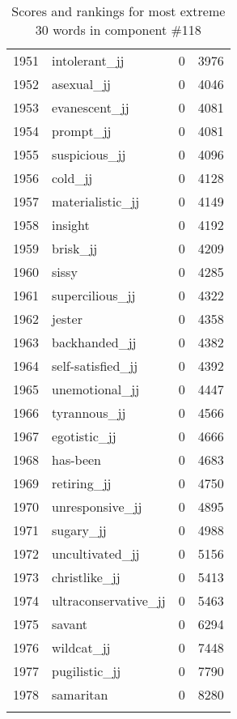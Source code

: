 \begin{longtable}[!htbp]{| rlr@{.}l |}
    1951 & intolerant\_jj & 0 & 3976 \\
    1952 & asexual\_jj & 0 & 4046 \\
    1953 & evanescent\_jj & 0 & 4081 \\
    1954 & prompt\_jj & 0 & 4081 \\
    1955 & suspicious\_jj & 0 & 4096 \\
    1956 & cold\_jj & 0 & 4128 \\
    1957 & materialistic\_jj & 0 & 4149 \\
    1958 & insight & 0 & 4192 \\
    1959 & brisk\_jj & 0 & 4209 \\
    1960 & sissy & 0 & 4285 \\
    1961 & supercilious\_jj & 0 & 4322 \\
    1962 & jester & 0 & 4358 \\
    1963 & backhanded\_jj & 0 & 4382 \\
    1964 & self-satisfied\_jj & 0 & 4392 \\
    1965 & unemotional\_jj & 0 & 4447 \\
    1966 & tyrannous\_jj & 0 & 4566 \\
    1967 & egotistic\_jj & 0 & 4666 \\
    1968 & has-been & 0 & 4683 \\
    1969 & retiring\_jj & 0 & 4750 \\
    1970 & unresponsive\_jj & 0 & 4895 \\
    1971 & sugary\_jj & 0 & 4988 \\
    1972 & uncultivated\_jj & 0 & 5156 \\
    1973 & christlike\_jj & 0 & 5413 \\
    1974 & ultraconservative\_jj & 0 & 5463 \\
    1975 & savant & 0 & 6294 \\
    1976 & wildcat\_jj & 0 & 7448 \\
    1977 & pugilistic\_jj & 0 & 7790 \\
    1978 & samaritan & 0 & 8280 \\
    \hline
    \caption{Scores and rankings for most extreme 30 words in component \#118} \\
\end{longtable}
